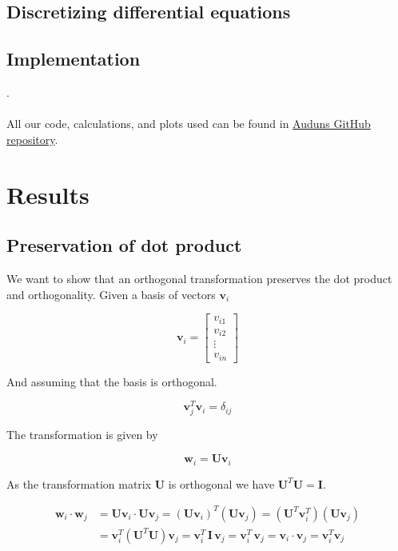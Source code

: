 \documentclass[a4paper, fontsize=11pt]{article}
\begin{document}
\subsection{Discretizing differential equations}


\subsection{Implementation}

.\cite{H-Jensen} 


\paragraph{}
All our code, calculations, and plots used can be found in \href{https://github.com/auduntre/FYS4150/tree/master/Project%203}{Auduns GitHub repository}.

\section{Results}
\subsection{Preservation of dot product}
We want to show that an orthogonal transformation preserves the dot product and orthogonality. Given a basis of vectors $\textbf{v}_{i}$

\begin{equation}
\textbf{v}_{i}=
\begin{bmatrix}
v_{i1} \\
v_{i2} \\
\vdots \\
v_{in}
\end{bmatrix}
\end{equation}

And assuming that the basis is orthogonal.

\begin{equation}
\textbf{v}^{T}_{j} \textbf{v}_{i} = \delta_{ij}
\end{equation}

The transformation is given by

\begin{equation}
\textbf{w}_{i} = \textbf{U} \textbf{v}_{i}
\end{equation}

As the transformation matrix \textbf{U} is orthogonal we have $\textbf{U}^{T}\textbf{U} = \textbf{I}$.

\begin{align*}
\textbf{w}_{i} \cdot \textbf{w}_{j} & =\textbf{U} \textbf{v}_{i} \cdot \textbf{U} \textbf{v}_{j} = (\textbf{U}\textbf{v}_{i})^{T}(\textbf{U}\textbf{v}_{j})=(\textbf{U}^{T} \textbf{v}_{i}^{T})(\textbf{U}\textbf{v}_{j})\\
&= \textbf{v}_{i}^{T} (\textbf{U}^{T} \textbf{U}) \textbf{v}_{j}= \textbf{v}_{i}^{T} \, \textbf{I} \, \textbf{v}_{j} =  \textbf{v}_{i}^{T} \,  \textbf{v}_{j} = \textbf{v}_{i} \cdot \textbf{v}_{j} = \textbf{v}^T_{i} \textbf{v}_{j}
\end{align*}
\end{document}
